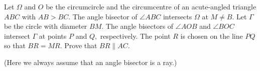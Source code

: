 Let 
$\Omega$
 and 
$O$
 be the circumcircle and the circumcentre of an acute-angled triangle 
$ABC$
 with 
$AB > BC$.
 The angle bisector of 
$\angle ABC$
 intersects 
$\Omega$
 at 
$M \ne B$.
 Let 
$\Gamma$
 be the circle with diameter 
$BM$.
 The angle bisectors of 
$\angle AOB$
 and 
$\angle BOC$
 intersect 
$\Gamma$
 at points 
$P$
 and 
$Q,$
 respectively. The point 
$R$
 is chosen on the line 
$P Q$
 so that 
$BR = MR$.
 Prove that 
$BR\parallel AC$.

(Here we always assume that an angle bisector is a ray.)

